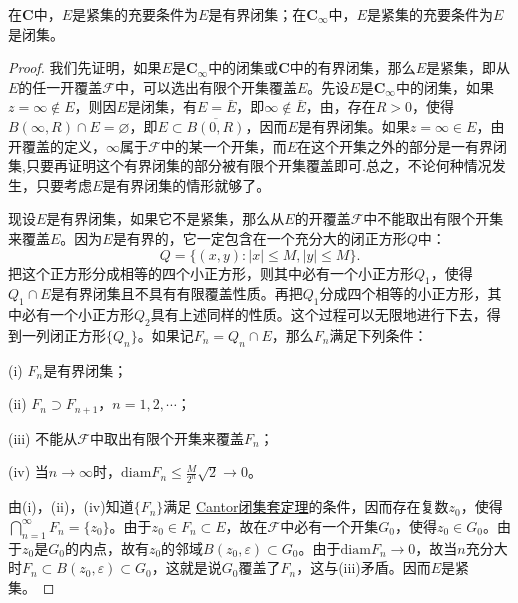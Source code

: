 \documentclass[../../main.tex]{subfiles}
\begin{document}
\begin{theorem}\label{theorem:Heine-Borel定理}
在\(\mathbf{C}\)中，\(E\)是紧集的充要条件为\(E\)是有界闭集；在\(\mathbf{C}_\infty\)中，\(E\)是紧集的充要条件为\(E\)是闭集。
\end{theorem}
\begin{proof}
我们先证明，如果\(E\)是\(\mathbf{C}_\infty\)中的闭集或\(\mathbf{C}\)中的有界闭集，那么\(E\)是紧集，即从\(E\)的任一开覆盖\(\mathscr{F}\)中，可以选出有限个开集覆盖\(E\)。先设\(E\)是\(\mathbf{C}_\infty\)中的闭集，如果\(z = \infty \notin E\)，则因\(E\)是闭集，有\(E = \bar{E}\)，即\(\infty \notin \bar{E}\)，由，存在\(R > 0\)，使得\(B(\infty, R) \cap E = \varnothing\)，即\(E \subset \overline{B(0, R)}\)，因而\(E\)是有界闭集。如果\(z = \infty \in E\)，由开覆盖的定义，\(\infty\)属于\(\mathscr{F}\)中的某一个开集，而\(E\)在这个开集之外的部分是一有界闭集,只要再证明这个有界闭集的部分被有限个开集覆盖即可.总之，不论何种情况发生，只要考虑\(E\)是有界闭集的情形就够了。

现设\(E\)是有界闭集，如果它不是紧集，那么从\(E\)的开覆盖\(\mathscr{F}\)中不能取出有限个开集来覆盖\(E\)。因为\(E\)是有界的，它一定包含在一个充分大的闭正方形\(Q\)中：
\[
Q = \{ (x, y) : | x | \leqslant M, | y | \leqslant M \}.
\]
把这个正方形分成相等的四个小正方形，则其中必有一个小正方形\(Q_1\)，使得\(Q_1 \cap E\)是有界闭集且不具有有限覆盖性质。再把\(Q_1\)分成四个相等的小正方形，其中必有一个小正方形\(Q_2\)具有上述同样的性质。这个过程可以无限地进行下去，得到一列闭正方形\(\{ Q_n \}\)。如果记\(F_n = Q_n \cap E\)，那么\(F_n\)满足下列条件：

(i) \(F_n\)是有界闭集；

(ii) \(F_n \supset F_{n + 1}\)，\(n = 1, 2, \cdots\)；

(iii) 不能从\(\mathscr{F}\)中取出有限个开集来覆盖\(F_n\)；

(iv) 当\(n \to \infty\)时，\(\mathrm{diam}F_n \leqslant \frac{M}{2^n} \sqrt{2} \to 0\)。

由(i)，(ii)，(iv)知道\(\{ F_n \}\)满足 \hyperref[theorem:Cantor闭集套定理]{Cantor闭集套定理}的条件，因而存在复数\(z_0\)，使得\(\bigcap_{n = 1}^\infty F_n = \{ z_0 \}\)。由于\(z_0 \in F_n \subset E\)，故在\(\mathscr{F}\)中必有一个开集\(G_0\)，使得\(z_0 \in G_0\)。由于\(z_0\)是\(G_0\)的内点，故有\(z_0\)的邻域\(B(z_0, \varepsilon) \subset G_0\)。由于\(\mathrm{diam}F_n \to 0\)，故当\(n\)充分大时\(F_n \subset B(z_0, \varepsilon) \subset G_0\)，这就是说\(G_0\)覆盖了\(F_n\)，这与(iii)矛盾。因而\(E\)是紧集。


\end{proof}
\end{document}
